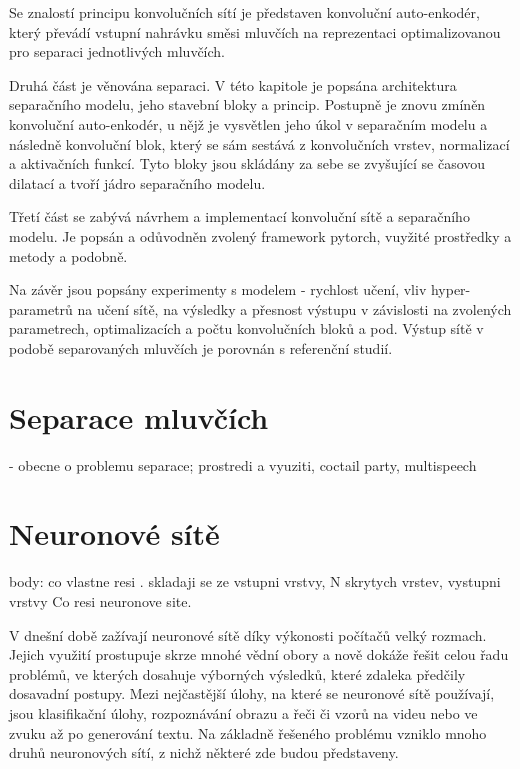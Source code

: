 Se znalostí principu konvolučních sítí je představen konvoluční auto-enkodér, který převádí vstupní nahrávku směsi mluvčích na reprezentaci optimalizovanou pro separaci jednotlivých mluvčích.

Druhá část je věnována separaci. V této kapitole je popsána architektura separačního modelu, jeho stavební bloky a princip. Postupně je znovu zmíněn konvoluční auto-enkodér, u nějž je vysvětlen jeho úkol v separačním modelu a následně konvoluční blok, který se sám sestává z konvolučních vrstev, normalizací a aktivačních funkcí. Tyto bloky jsou skládány za sebe se zvyšující se časovou dilatací a tvoří jádro separačního modelu.

Třetí část se zabývá návrhem a implementací konvoluční sítě a separačního modelu. Je popsán a odůvodněn zvolený framework pytorch, vuyžité prostředky a metody a podobně.

Na závěr jsou popsány experimenty s modelem - rychlost učení, vliv hyper-parametrů na učení sítě, na výsledky a přesnost výstupu v závislosti na zvolených parametrech, optimalizacích a počtu konvolučních bloků a pod. Výstup sítě v podobě separovaných mluvčích je porovnán s referenční studií.


\chapter{Separace mluvčích}
\label{separacemluvcich}
- obecne o problemu separace; prostredi a vyuziti, coctail party, multispeech

\chapter{Neuronové sítě}
\label{neuronovky}
body: co vlastne resi . skladaji se ze vstupni vrstvy, N skrytych vrstev, vystupni vrstvy
Co resi neuronove site.

V dnešní době zažívají neuronové sítě díky výkonosti počítačů velký rozmach. Jejich využití prostupuje skrze mnohé vědní obory a nově dokáže řešit celou řadu problémů, ve kterých dosahuje výborných výsledků, které zdaleka předčily dosavadní postupy. Mezi nejčastější úlohy, na které se neuronové sítě používají, jsou klasifikační úlohy, rozpoznávání obrazu a řeči či vzorů na videu nebo ve zvuku až po generování textu. Na základně řešeného problému vzniklo mnoho druhů neuronových sítí, z nichž některé zde budou představeny.

